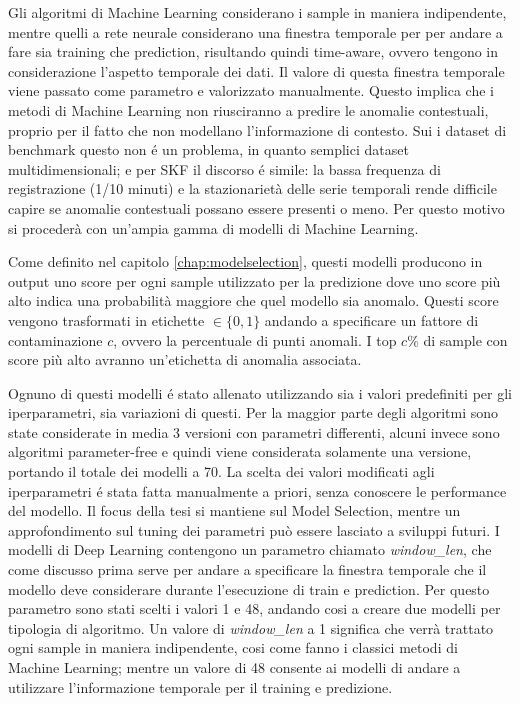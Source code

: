 Gli algoritmi di Machine Learning considerano i sample in maniera indipendente, mentre quelli a rete neurale considerano una finestra temporale per per andare a fare sia training che prediction, risultando quindi time-aware, ovvero tengono in considerazione l'aspetto temporale dei dati. Il valore di questa finestra temporale viene passato come parametro e valorizzato manualmente.
Questo implica che i metodi di Machine Learning non riusciranno a predire le anomalie contestuali, proprio per il fatto che non modellano l'informazione di contesto. 
Sui i dataset di benchmark questo non é un problema, in quanto semplici dataset multidimensionali; e per SKF il discorso é simile: la bassa frequenza di registrazione (1/10 minuti) e la stazionarietà delle serie temporali rende difficile capire se anomalie contestuali possano essere presenti o meno. Per questo motivo si procederà con un'ampia gamma di modelli di Machine Learning.


Come definito nel capitolo \ref{chap:modelselection}, questi modelli producono in output uno score per ogni sample utilizzato per la predizione dove uno score più alto indica una probabilità maggiore che quel modello sia anomalo. Questi score vengono trasformati in etichette \(\in \{0,1\}\) andando a specificare un fattore di contaminazione $c$, ovvero la percentuale di punti anomali. I top $c\%$ di sample con score più alto avranno un'etichetta di anomalia associata. 

Ognuno di questi modelli é stato allenato utilizzando sia i valori predefiniti per gli iperparametri, sia variazioni di questi. 
Per la maggior parte degli algoritmi sono state considerate in media 3 versioni con parametri differenti, alcuni invece sono algoritmi parameter-free e quindi viene considerata solamente una versione, portando il totale dei modelli a 70.
La scelta dei valori modificati agli iperparametri é stata fatta manualmente a priori, senza conoscere le performance del modello. Il focus della tesi si mantiene sul Model Selection, mentre un approfondimento sul tuning dei parametri può essere lasciato a sviluppi futuri.
I modelli di Deep Learning contengono un parametro chiamato \textit{window\_len}, che come discusso prima serve per andare a specificare la finestra temporale che il modello deve considerare durante l'esecuzione di train e prediction. Per questo parametro sono stati scelti i valori 1 e 48, andando cosi a creare due modelli per tipologia di algoritmo. 
Un valore di \textit{window\_len} a 1 significa che verrà trattato ogni sample in maniera indipendente, cosi come fanno i classici metodi di Machine Learning; mentre un valore di 48 consente ai modelli di andare a utilizzare l'informazione temporale per il training e predizione.

